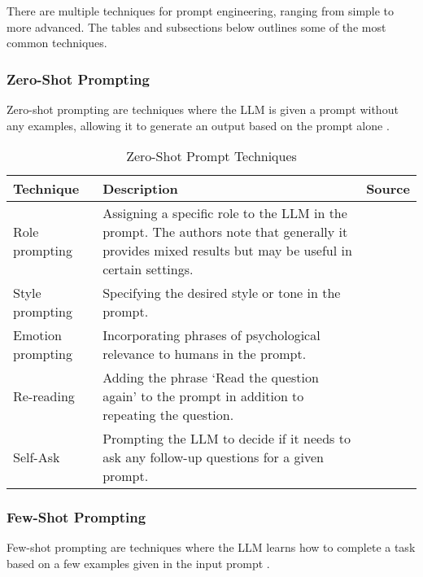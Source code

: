 There are multiple techniques for prompt engineering, ranging from simple to more advanced. The tables and subsections below outlines some of the most common techniques.

\subsubsection{Zero-Shot Prompting}

Zero-shot prompting are techniques where the LLM is given a prompt without any examples, allowing it to generate an output based on the prompt alone \parencite{prompt1}.

\begin{table}[h!]
    \centering
    \begin{tabular}{p{3cm} p{8cm} p{2cm}}
        \toprule
        \textbf{Technique} & \textbf{Description} & \textbf{Source} \\
        \midrule
        \raggedright
        Role prompting & Assigning a specific role to the LLM in the prompt. The authors note that generally it provides mixed results but may be useful in certain settings.  & \textcite{role1} \\
        \hline
        \raggedright
        Style prompting & Specifying the desired style or tone in the prompt. & \textcite{style} \\
        \hline
        \raggedright
        Emotion prompting & Incorporating phrases of psychological relevance to humans in the prompt. & \textcite{emotion} \\
        \hline
        \raggedright
        Re-reading & Adding the phrase `Read the question again' to the prompt in addition to repeating the question. & \textcite{rereading} \\
        \hline
        \raggedright
        Self-Ask & Prompting the LLM to decide if it needs to ask any follow-up questions for a given prompt. &  \textcite{selfask} \\
        \bottomrule
    \end{tabular}
    \caption{Zero-Shot Prompt Techniques}
    \label{tab:zero_shot}
\end{table}

\FloatBarrier

\subsubsection{Few-Shot Prompting}

Few-shot prompting are techniques where the LLM learns how to complete a task based on a few examples given in the input prompt \parencite{prompt1}.

